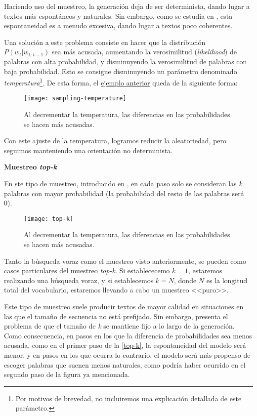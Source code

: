 Haciendo uso del muestreo, la generación deja de ser determinista, dando lugar a textos más espontáneos y naturales. Sin embargo, como se estudia en \cite{holtzman20}, esta espontaneidad es a menudo excesiva, dando lugar a textos poco coherentes.

Una solución a este problema consiste en hacer que la distribución $P(w_t|w_{1:t-1})$ sea más acusada, aumentando la verosimilitud (\emph{likelihood}) de palabras con alta probabilidad, y disminuyendo la verosimilitud de palabras con baja probabilidad. Esto se consigue disminuyendo un parámetro denominado \emph{temperatura}\footnote{\hspace{0.06cm}Por motivos de brevedad, no incluiremos una explicación detallada de este parámetro.}. De esta forma, el \hyperref[fig:muestreo]{ejemplo anterior} queda de la siguiente forma:

\begin{figure}[!h]
	\centering
	\texttt{[image: sampling-temperature]}
	\caption{Al decrementar la temperatura, las diferencias en las  probabilidades se hacen más acusadas.}
\end{figure}

Con este ajuste de la temperatura, logramos reducir la aleatoriedad, pero seguimos manteniendo una orientación no determinista.

\newpage

\bigskip
\noindent
\textbf{Muestreo \emph{top-k}}

En ste tipo de muestreo, introducido en \cite{fan18}, en cada paso solo se consideran las \emph{k} palabras con mayor probabilidad (la probabilidad del resto de las palabras será 0).

\begin{figure}[!h]
	\centering
	\texttt{[image: top-k]}
	\caption{Al decrementar la temperatura, las diferencias en las  probabilidades se hacen más acusadas.}
	\label{top-k}
\end{figure}

Tanto la búsqueda voraz como el muestreo visto anteriormente, se pueden como casos particulares del muestreo \emph{top-k}. Si establececemo $k = 1$, estaremos realizando una búsqueda voraz, y si establecemos $k = N$, donde $N$ es la longitud total del vocabulario, estaremos llevando a cabo un muestreo <<puro>>.

Este tipo de muestreo suele producir textos de mayor calidad en situaciones en las que el tamaño de secuencia no está prefijado. Sin embargo, presenta el problema de que el tamaño de \emph{k} se mantiene fijo a lo largo de la generación. Como consecuencia, en pasos en los que la diferencia de probabilidades sea menos acusada, como en el primer paso de la \autoref{top-k}, la espontaneidad del modelo será menor, y en pasos en los que ocurra lo contrario, el modelo será más propenso de escoger palabras que suenen menos naturales, como podría haber ocurrido en el segundo paso de la figura ya mencionada.


